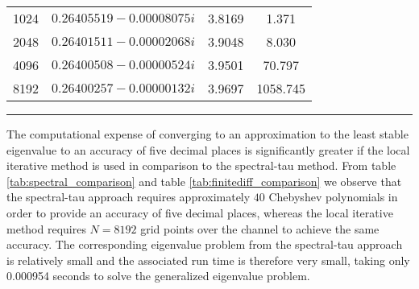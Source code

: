 \documentclass[a4paper, 12pt, twoside, openright]{article}
\numberwithin{equation}{section}
\begin{document}
\begin{table}[ht]
\begin{tabular}{ c@{\qquad} c@{\qquad} c@{\qquad} c@{\qquad} }
1024 & $ 0.26405519 - 0.00008075i $ & 3.8169 & 1.371\\
2048 & $ 0.26401511 - 0.00002068i $ & 3.9048 & 8.030 \\
4096 & $0.26400508 - 0.00000524i$ & 3.9501 & 70.797 \\
8192 & $0.26400257 - 0.00000132i$ & 3.9697 & 1058.745 \\
\end{tabular}
\egroup
{}

\rule{\linewidth}{1.5pt}
\end{table}



The computational expense of converging to an approximation to the least stable eigenvalue to an accuracy of five decimal places is significantly greater if the local iterative method is used in comparison to the spectral-tau method. From table \ref{tab:spectral_comparison} and table \ref{tab:finitediff_comparison} we observe that the spectral-tau approach requires approximately $40$ Chebyshev polynomials in order to  provide an accuracy of five decimal places, whereas the local iterative method requires $N=8192$ grid points over the channel to achieve the same accuracy. The corresponding eigenvalue problem from the spectral-tau approach is relatively small and the associated run time is therefore very small, taking only 0.000954 seconds to solve the generalized eigenvalue problem. %
\end{document}
